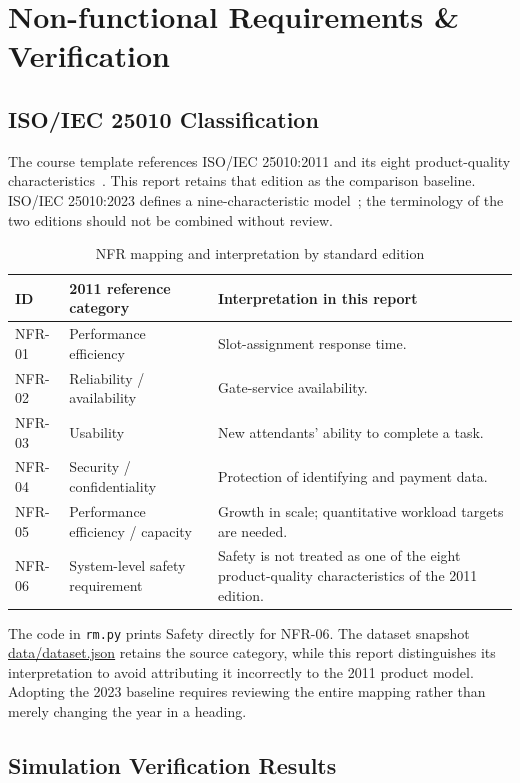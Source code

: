 \chapter{Non-functional Requirements \& Verification}
\section{ISO/IEC 25010 Classification}
The course template references ISO/IEC 25010:2011 and its eight product-quality characteristics~\cite{iso25010}. This report retains that edition as the comparison baseline. ISO/IEC 25010:2023 defines a nine-characteristic model~\cite{iso2023}; the terminology of the two editions should not be combined without review.
\begin{table}[H]\centering\small\caption{NFR mapping and interpretation by standard edition}
\begin{tabularx}{\linewidth}{L{18mm}L{46mm}X}\toprule
\textbf{ID} & \textbf{2011 reference category} & \textbf{Interpretation in this report}\\\midrule
NFR-01 & Performance efficiency & Slot-assignment response time.\\
NFR-02 & Reliability / availability & Gate-service availability.\\
NFR-03 & Usability & New attendants' ability to complete a task.\\
NFR-04 & Security / confidentiality & Protection of identifying and payment data.\\
NFR-05 & Performance efficiency / capacity & Growth in scale; quantitative workload targets are needed.\\
NFR-06 & System-level safety requirement & Safety is not treated as one of the eight product-quality characteristics of the 2011 edition.\\\bottomrule
\end{tabularx}\end{table}
The code in \texttt{rm.py} prints Safety directly for NFR-06. The dataset snapshot \url{data/dataset.json} retains the source category, while this report distinguishes its interpretation to avoid attributing it incorrectly to the 2011 product model. Adopting the 2023 baseline requires reviewing the entire mapping rather than merely changing the year in a heading.

\section{Simulation Verification Results}
